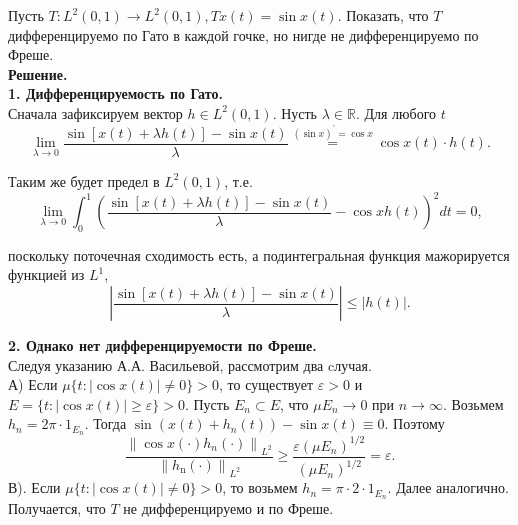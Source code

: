 \begin{task}
Пусть $T: L^2(0,1) \rightarrow L^2(0,1), T x(t)=\sin x(t)$. Показать, что $T$ дифференцируемо по Гато в каждой гочке, но нигде не дифференцируемо по Фреше.
\\
\textbf{Решение.} \\

\textbf{1. Дифференцируемость по Гато.} \\
Сначала зафиксируем вектор $h \in L^2(0,1)$. Нусть $\lambda \in \mathbb{R}$. Для любого $t$
$$
\lim _{\lambda \rightarrow 0} \frac{\sin [x(t)+\lambda h(t)]-\sin x(t)}{\lambda} \stackrel{(\sin x)^{\prime}=\cos x}{=} \cos x(t) \cdot h(t) .
$$

Таким же будет предел в $L^2(0,1)$, т.е.
$$
\lim _{\lambda \rightarrow 0} \int_0^1\left(\frac{\sin [x(t)+\lambda h(t)]-\sin x(t)}{\lambda}-\cos x h(t)\right)^2 d t=0,
$$

поскольку поточечная сходимость есть, а подинтегральная функция мажорируется функцией из $L^1$,
$$
\left|\frac{\sin [x(t)+\lambda h(t)]-\sin x(t)}{\lambda}\right| \leq|h(t)|.
$$

\textbf{2. Однако нет дифференцируемости по Фреше.} \\
Следуя указанию А.А. Васильевой, рассмотрим два cлучая.
\\
А) Если $\mu\{t:|\cos x(t)| \neq 0\}>0$, то существует $\varepsilon>0$ и $E=\{t:|\cos x(t)| \geq \varepsilon\}>0$. 
Пусть $E_n \subset E$, что $\mu E_n \rightarrow 0$ при $n \rightarrow \infty$. Возьмем $h_n=2 \pi \cdot 1_{E_n}$. Тогда $\sin \left(x(t)+h_n(t)\right)-\sin x(t) \equiv 0$. Поэтому
$$
\frac{\left\|\cos x(\cdot) h_n(\cdot)\right\|_{L^2}}{\left\|h_{\mathrm{n}}(\cdot)\right\|_{L^2}} \geq \frac{\varepsilon\left(\mu E_n\right)^{1 / 2}}{\left(\mu E_n\right)^{1 / 2}}=\varepsilon .
$$
В). Если $\mu\{t:|\cos x(t)| \neq 0\}>0$, то возьмем $h_n=\pi \cdot 2 \cdot 1_{E_n}$. Далее аналогично. Получается, что $T$ не дифференцируемо и по Фреше.

\end{task}
